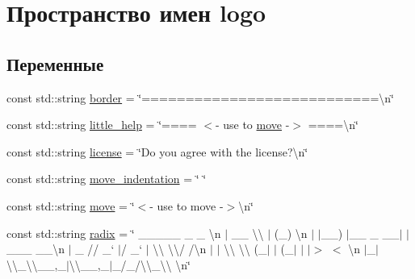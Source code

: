 \hypertarget{namespacelogo}{}\section{Пространство имен logo}
\label{namespacelogo}
\subsection*{Переменные}
\begin{DoxyCompactItemize}
\item 
const std\+::string \hyperlink{namespacelogo_a75fab9a3dcd27565e40b08dbbcbf5e6b}{border} = \char`\"{}===========================\textbackslash{}n\char`\"{}
\item 
const std\+::string \hyperlink{namespacelogo_adf18ab31906b644891fc8311df747a9d}{little\+\_\+help} = \char`\"{}==== $<$-\/ use to \hyperlink{namespacelogo_a03b6b80b5648e7dbbbf00b258df733b6}{move} -\/$>$ ====\textbackslash{}n\char`\"{}
\item 
const std\+::string \hyperlink{namespacelogo_ae5491adc000fde7d3d8229372c877da2}{license} = \char`\"{}Do you agree with the license?\textbackslash{}n\char`\"{}
\item 
const std\+::string \hyperlink{namespacelogo_a7570bf74bf945a06ced26f6fccaeab53}{move\+\_\+indentation} = \char`\"{} \char`\"{}
\item 
const std\+::string \hyperlink{namespacelogo_a03b6b80b5648e7dbbbf00b258df733b6}{move} = \char`\"{}$<$-\/ use to move -\/$>$\textbackslash{}n\char`\"{}
\item 
const std\+::string \hyperlink{namespacelogo_abbbdbfbbcae50e2017f3ed1bdf0e1fa3}{radix} = \char`\"{} \+\_\+\+\_\+\+\_\+\+\_\+\+\_\+ \+\_\+ \+\_\+ \textbackslash{}n $\vert$ \+\_\+\+\_\+ \textbackslash{}\textbackslash{} $\vert$ (\+\_\+) \textbackslash{}n $\vert$ $\vert$\+\_\+\+\_\+) $\vert$\+\_\+\+\_\+ \+\_\+ \+\_\+\+\_\+$\vert$ $\vert$\+\_\+\+\_\+\+\_\+ \+\_\+\+\_\+\textbackslash{}n $\vert$ \+\_\+ // \+\_\+` $\vert$/ \+\_\+` $\vert$ \textbackslash{}\textbackslash{} \textbackslash{}\textbackslash{}/ /\textbackslash{}n $\vert$ $\vert$ \textbackslash{}\textbackslash{} \textbackslash{}\textbackslash{} (\+\_\+$\vert$ $\vert$ (\+\_\+$\vert$ $\vert$ $\vert$$>$ $<$ \textbackslash{}n $\vert$\+\_\+$\vert$ \textbackslash{}\textbackslash{}\+\_\+\textbackslash{}\textbackslash{}\+\_\+\+\_\+,\+\_\+$\vert$\textbackslash{}\textbackslash{}\+\_\+\+\_\+,\+\_\+$\vert$\+\_\+/\+\_\+/\textbackslash{}\textbackslash{}\+\_\+\textbackslash{}\textbackslash{} \textbackslash{}n\char`\"{}
\item 
$$
\end{DoxyCompactItemize}
